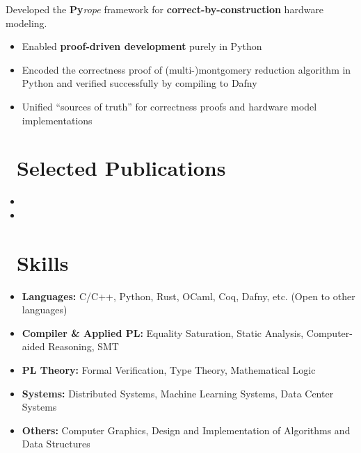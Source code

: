 \documentclass{resume}
\begin{document}
Developed the \textbf{Py}\textit{rope} framework for \textbf{correct-by-construction} hardware modeling.
\begin{itemize}
  \item Enabled \textbf{proof-driven development} purely in Python
  \item Encoded the correctness proof of (multi-)montgomery reduction algorithm in Python and verified successfully by compiling to Dafny
  \item Unified ``sources of truth'' for correctness proofs and hardware model implementations
\end{itemize}

\section{\faLeanpub\ Selected Publications}
\begin{itemize}
    \item {}
    \item {}
\end{itemize}

\section{\faCog\ Skills}
\begin{itemize}
    \item \textbf{Languages:} C/C++, Python, Rust, OCaml, Coq, Dafny, etc. (Open to other languages)
    \item \textbf{Compiler \& Applied PL:} Equality Saturation, Static Analysis, Computer-aided Reasoning, SMT
    \item \textbf{PL Theory:} Formal Verification, Type Theory, Mathematical Logic
    \item \textbf{Systems:} Distributed Systems, Machine Learning Systems, Data Center Systems
    \item \textbf{Others:} Computer Graphics, Design and Implementation of Algorithms and Data Structures
\end{itemize}

\end{document}
